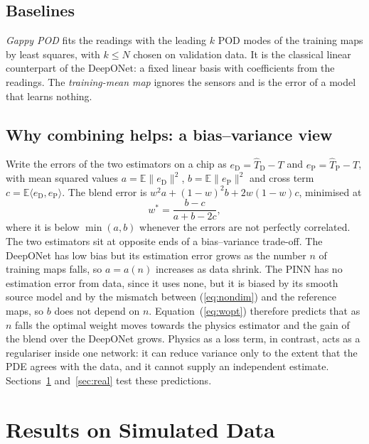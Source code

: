 \documentclass[journal]{IEEEtran}
\begin{document}
\subsection{Baselines}
\emph{Gappy POD} \cite{everson1995gappy,willcox2006gappy} fits the readings with the leading $k$ POD modes of the training maps by least squares, with $k\le N$ chosen on validation data.
It is the classical linear counterpart of the DeepONet: a fixed linear basis with coefficients from the readings.
The \emph{training-mean map} ignores the sensors and is the error of a model that learns nothing.

\subsection{Why combining helps: a bias--variance view}\label{sec:biasvar}
Write the errors of the two estimators on a chip as $e_\mathrm{D}=\hat T_\mathrm{D}-T$ and $e_\mathrm{P}=\hat T_\mathrm{P}-T$, with mean squared values $a=\mathbb E\|e_\mathrm{D}\|^2$, $b=\mathbb E\|e_\mathrm{P}\|^2$ and cross term $c=\mathbb E\langle e_\mathrm{D},e_\mathrm{P}\rangle$.
The blend error is $w^2a+(1-w)^2b+2w(1-w)c$, minimised at
\begin{equation}\label{eq:wopt}
w^\ast=\frac{b-c}{a+b-2c},
\end{equation}
where it is below $\min(a,b)$ whenever the errors are not perfectly correlated.
The two estimators sit at opposite ends of a bias--variance trade-off.
The DeepONet has low bias but its estimation error grows as the number $n$ of training maps falls, so $a=a(n)$ increases as data shrink.
The PINN has no estimation error from data, since it uses none, but it is biased by its smooth source model and by the mismatch between (\ref{eq:nondim}) and the reference maps, so $b$ does not depend on $n$.
Equation~(\ref{eq:wopt}) therefore predicts that as $n$ falls the optimal weight moves towards the physics estimator and the gain of the blend over the DeepONet grows.
Physics as a loss term, in contrast, acts as a regulariser inside one network: it can reduce variance only to the extent that the PDE agrees with the data, and it cannot supply an independent estimate.
Sections~\ref{sec:sim} and~\ref{sec:real} test these predictions.

\section{Results on Simulated Data}\label{sec:sim}
\end{document}
